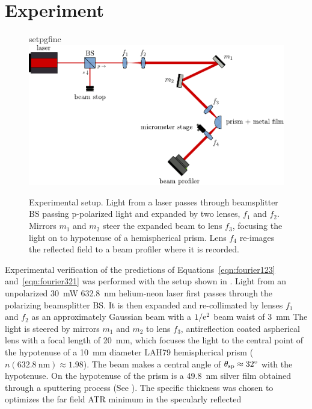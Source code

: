 \section{Experiment}\label{sec:intexperimental}
\begin{figure}[ht]
\centering
{setpgfinc}
\includegraphics[keepaspectratio,width=14cm]{interference/figures/opticalsetup.pdf}
\caption{Experimental setup.  Light from a laser passes through beamsplitter
BS passing p-polarized light and expanded by two lenses, $f_1$ and $f_2$.
Mirrors $m_1$ and $m_2$ steer the expanded beam to lens $f_3$, focusing the
light on to hypotenuse of a hemispherical prism.  Lens $f_4$ re-images the reflected field to a beam profiler where it is recorded.}
\label{fig:opticalsetup}
\end{figure}
Experimental verification of the predictions of Equations~\ref{eqn:fourier123}
and~\ref{eqn:fourier321} was performed with the setup shown in
.  Light from an
unpolarized \SI{30}{\milli\watt} \SI{632.8}{\nano\meter} helium-neon
laser first passes through the polarizing
beamsplitter BS\@.  It is then expanded and re-collimated by lenses $f_1$ and $f_2$ as an
approximately Gaussian beam with a $1/{\mathrm{e}}^2$ beam waist of
\SI{3}{\milli\meter} The light is steered by mirrors $m_1$ and $m_2$ to
lens $f_3$, antireflection coated aspherical lens with a focal length of
\SI{20}{\milli\meter}, which
focuses the light to the central point of the hypotenuse of a
\SI{10}{\milli\meter} diameter LAH79 hemispherical prism
($n(\SI{632.8}{\nano\meter})\approx1.98$).  The beam makes a central angle
of $\theta_\mathrm{sp}\approx\SI{32}{\degree}$ with the hypotenuse.
On the hypotenuse of the prism is a \SI{49.8}{\nano\meter} silver film
obtained through a sputtering process (See ).
The specific thickness was chosen to
optimizes the far field ATR minimum in the specularly reflected
